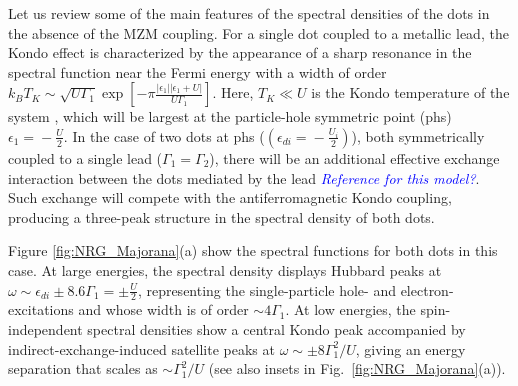 \documentclass[showpacs,aps,prb,reprint,superscriptaddress]{revtex4-1}
\newcommand{\LUIS}[1]{\textcolor{blue}{\fbox{Luis} {\sl#1}}}
\begin{document}
Let us review some of the main features of the spectral densities of the dots in the absence of the MZM coupling. For a single dot coupled to a metallic lead, the Kondo effect is characterized by the appearance of a sharp resonance in the spectral function near the Fermi energy with a width of order $k_B T_K \!\sim\! \sqrt{U \Gamma_1} \exp \left[- \pi\frac{|\epsilon_1| |\epsilon_1 + U|}{U \Gamma_1}  \right]$. Here, $T_K \ll U$ is the Kondo temperature  of the system \cite{hewson_kondo_1997}, which will be largest at the particle-hole symmetric point (phs)  $\epsilon_1 \!=\!-\frac{U}{2}$. In the case of two dots at phs ($\left(\epsilon_{di}\!=\! -\frac{U_i}{2}\right)$), both symmetrically coupled to a single lead ($\Gamma_1\!=\!\Gamma_2$), there will be an additional effective exchange interaction between the dots mediated by the lead \LUIS{Reference for this model?}. Such exchange will compete with the antiferromagnetic Kondo coupling, producing a three-peak structure in the spectral density of both dots. 

Figure \ref{fig:NRG_Majorana}(a) show the spectral functions for both dots in this case. At large energies, the spectral density displays Hubbard peaks at $\omega \sim \epsilon_{di} \pm 8.6\Gamma_1 = \pm \frac{U}{2}$, representing the single-particle hole- and electron-excitations and whose width is of order $\sim 4\Gamma_1$. At low energies, the spin-independent spectral densities show a central Kondo peak accompanied by indirect-exchange-induced satellite peaks at $\omega \sim \pm 8 \Gamma^2_1/U$, giving an energy separation that scales as $\sim \Gamma^2_1/U$ (see also insets in Fig.\ \ref{fig:NRG_Majorana}(a)). 



\end{document}
